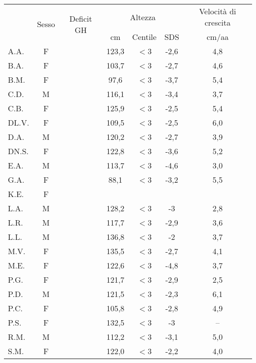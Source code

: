 \begin{table}[!h]
\begin{center}
\begin{tabular}{lcccccc}
\toprule
 & \multirow{2}{*}{Sesso} & \multirow{2}{*}{Deficit GH} & \multicolumn{3}{c}{Altezza} & \multicolumn{1}{c}{Velocità di crescita} \\
 \cmidrule(r){4-6}
 & &   							& cm    & Centile  & SDS & cm/aa	 \\
\midrule
A.A.	& F &  				 		& 123,3 & $<$3  & -2,6 & 4,8 \\
B.A.	& F & \checkmark 	  				& 103,7 & $<$3  & -2,7 & 4,6  \\
B.M.	& F & \checkmark 	  				&  97,6 & $<$3  & -3,7 & 5,4 \\
C.D.	& M & \checkmark 	  				& 116,1 & $<$3  & -3,4 & 3,7 \\
C.B.	& F &  				 	        & 125,9 & $<$3  & -2,5 & 5,4 \\
DL.V.	& F & \checkmark 	  				& 109,5 & $<$3  & -2,5 & 6,0  \\
D.A.	& M &  				  		& 120,2 & $<$3  & -2,7 & 3,9 \\
DN.S.	& F & \checkmark 	  				& 122,8 & $<$3  & -3,6 & 5,2 \\
E.A.	& M &  				  		& 113,7 & $<$3  & -4,6 & 3,0 \\
G.A.	& F &  				  		&  88,1 & $<$3  & -3,2 & 5,5 \\
K.E.	& F &  				  		&       &       &      &     \\
L.A.	& M & \checkmark 	  				& 128,2 & $<$3  & -3   & 2,8 \\
L.R.	& M &  				  		& 117,7 & $<$3  & -2,9 & 3,6 \\
L.L.	& M &  				  		& 136,8 & $<$3  & -2   & 3,7  \\
M.V.	& F & \checkmark 	  				& 135,5 & $<$3  & -2,7 & 4,1 \\
M.E.	& F &  				  		& 122,6 & $<$3  & -4,8 & 3,7 \\
P.G.	& F & \checkmark 	  				& 121,7 & $<$3  & -2,9 & 2,5 \\
P.D.	& M &  				  		& 121,5 & $<$3  & -2,3 & 6,1 \\
P.C.	& F &  				  		& 105,8 & $<$3  & -2,8 & 4,9  \\
P.S.	& F &  				  		& 132,5 & $<$3  & -3   & --  \\
R.M.	& M & \checkmark 	  				& 112,2 & $<$3  & -3,1 & 5,0 \\
S.M.	& F & \checkmark 	  				& 122,0 & $<$3  & -2,2 & 4,0 \\

\end{tabular}
\end{center}
\end{table}
